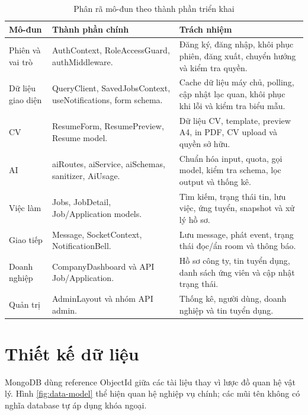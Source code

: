 \begin{table}[H]
    \centering
    \small
    \begin{tabularx}{\textwidth}{|p{}|p{}|Y|} \hline
        \textbf{Mô-đun} & \textbf{Thành phần chính} & \textbf{Trách nhiệm} \\ \hline
        Phiên và vai trò & AuthContext, RoleAccessGuard, authMiddleware. & Đăng ký, đăng nhập, khôi phục phiên, đăng xuất, chuyển hướng và kiểm tra quyền. \\ \hline
        Dữ liệu giao diện & QueryClient, SavedJobsContext, useNotifications, form schema. & Cache dữ liệu máy chủ, polling, cập nhật lạc quan, khôi phục khi lỗi và kiểm tra biểu mẫu. \\ \hline
        CV & ResumeForm, ResumePreview, Resume model. & Dữ liệu CV, template, preview A4, in PDF, CV upload và quyền sở hữu. \\ \hline
        AI & aiRoutes, aiService, aiSchemas, sanitizer, AiUsage. & Chuẩn hóa input, quota, gọi model, kiểm tra schema, lọc output và thống kê. \\ \hline
        Việc làm & Jobs, JobDetail, Job/Application models. & Tìm kiếm, trạng thái tin, lưu việc, ứng tuyển, snapshot và xử lý hồ sơ. \\ \hline
        Giao tiếp & Message, SocketContext, NotificationBell. & Lưu message, phát event, trạng thái đọc/ẩn room và thông báo. \\ \hline
        Doanh nghiệp & CompanyDashboard và API Job/Application. & Hồ sơ công ty, tin tuyển dụng, danh sách ứng viên và cập nhật trạng thái. \\ \hline
        Quản trị & AdminLayout và nhóm API admin. & Thống kê, người dùng, doanh nghiệp và tin tuyển dụng. \\ \hline
    \end{tabularx}
    \caption{Phân rã mô-đun theo thành phần triển khai}
    \label{tab:module-design}
\end{table}

\section{Thiết kế dữ liệu}

MongoDB dùng reference ObjectId giữa các tài liệu thay vì lược đồ quan hệ vật lý. Hình \ref{fig:data-model} thể hiện quan hệ nghiệp vụ chính; các mũi tên không có nghĩa database tự áp dụng khóa ngoại.

